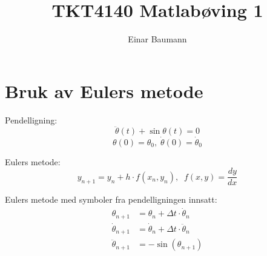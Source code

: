 



\author{Einar Baumann}
\title{TKT4140 Matlabøving 1}
\maketitle

\section{Bruk av Eulers metode} %
\label{sec:bruk_av_eulers_metode}
Pendelligning:
\begin{equation}
  \label{eq:pendulum}
  \ddot{\theta}(t) + \sin \theta(t) = 0
\end{equation}
\begin{equation}
  \nonumber
  \theta(0) = \theta_0, \; \dot{\theta}(0) = \dot{\theta}_0
\end{equation}

\noindent Eulers metode:
\begin{equation}
  y_{n+1} = y_n + h \cdot f(x_n, y_n), \;\; f(x,y) = \frac{dy}{dx}
\end{equation}

\noindent Eulers metode med symboler fra pendelligningen innsatt:
\begin{align}
  \theta_{n+1}        &= \theta_n + \Delta t \cdot \dot{\theta}_n \\
  \dot{\theta}_{n+1}  &= \dot{\theta}_n + \Delta t \cdot \ddot{\theta}_n \\
  \ddot{\theta}_{n+1} &= - \sin (\theta_{n+1})
\end{align}



